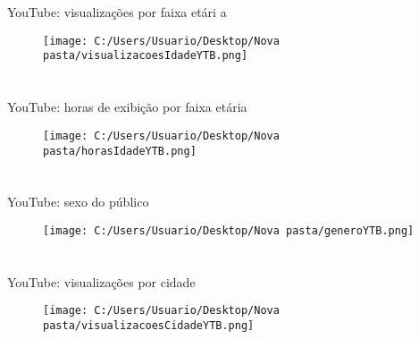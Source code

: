\documentclass{article}%
\begin{document}
%
\section*{}%
\label{sec:}%
YouTube: visualizações por faixa etári a%


\begin{figure}[H]%
\centering%
\texttt{[image: C:/Users/Usuario/Desktop/Nova pasta/visualizacoesIdadeYTB.png]}%
\end{figure}

%
\newpage%
\section*{}%
\label{sec:}%
YouTube: horas de exibição por faixa etária%


\begin{figure}[H]%
\centering%
\texttt{[image: C:/Users/Usuario/Desktop/Nova pasta/horasIdadeYTB.png]}%
\end{figure}

%
\section*{}%
\label{sec:}%
YouTube: sexo do público%


\begin{figure}[H]%
\centering%
\texttt{[image: C:/Users/Usuario/Desktop/Nova pasta/generoYTB.png]}%
\end{figure}

%
\section*{}%
\label{sec:}%
YouTube: visualizações por cidade%


\begin{figure}[H]%
\centering%
\texttt{[image: C:/Users/Usuario/Desktop/Nova pasta/visualizacoesCidadeYTB.png]}%
\end{figure}
\end{document}

